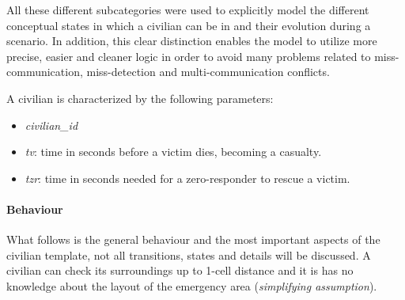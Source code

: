 \noindent
All these different subcategories were used to explicitly model the different conceptual states in which a civilian can be in and their evolution during a scenario. In addition, this clear distinction enables the model to utilize more precise, easier and cleaner logic in order to avoid many problems related to miss-communication, miss-detection and multi-communication conflicts.\newline

\noindent
A civilian is characterized by the following parameters:
\begin{itemize}
	\item \textit{civilian\_id}
	\item \textit{tv}: time in seconds before a victim dies, becoming a casualty.
	\item \textit{tzr}: time in seconds needed for a zero-responder to rescue a victim.
\end{itemize}

\paragraph{Behaviour}
What follows is the general behaviour and the most important aspects of the civilian template, not all transitions, states and details will be discussed.\newline
A civilian can check its surroundings up to 1-cell distance and it is has no knowledge about the layout of the emergency area (\textit{simplifying assumption}).

